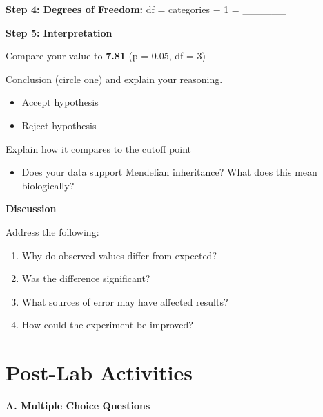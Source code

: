 \documentclass[
  letterpaper,
  DIV=11,
  numbers=noendperiod]{scrreprt}
\providecommand{\tightlist}{%
  \setlength{\itemsep}{0pt}\setlength{\parskip}{0pt}}
\begin{document}
\textbf{Step 4: Degrees of Freedom:} df = categories − 1 = \_\_\_\_\_\_

\textbf{Step 5: Interpretation}

Compare your value to \textbf{7.81} (p = 0.05, df = 3)

Conclusion (circle one) and explain your reasoning.

\begin{itemize}
\tightlist
\item
  Accept hypothesis
\end{itemize}

\begin{itemize}
\tightlist
\item
  Reject hypothesis
\end{itemize}

Explain how it compares to the cutoff point

\begin{itemize}
\tightlist
\item
  Does your data support Mendelian inheritance? What does this mean
  biologically?
\end{itemize}

\textbf{Discussion}

Address the following:

\begin{enumerate}
\def\labelenumi{\arabic{enumi}.}
\item
  Why do observed values differ from expected?
\item
  Was the difference significant?
\item
  What sources of error may have affected results?
\item
  How could the experiment be improved?
\end{enumerate}

\section{\texorpdfstring{\textbf{Post-Lab
Activities}}{Post-Lab Activities}}\label{post-lab-activities-2}

\textbf{A. Multiple Choice Questions}
\end{document}
